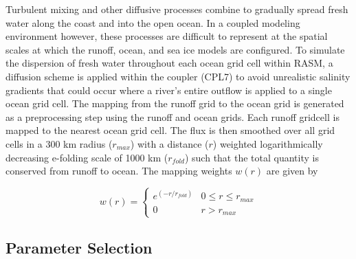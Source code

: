 \documentclass[jgrga, draft]{agutex}
\begin{document}
\begin{article}
\begin{itemize}[leftmargin=+.5in]
\begin{itemize}[leftmargin=+.5in]
Turbulent mixing and other diffusive processes combine to gradually spread fresh water along the coast and into the open ocean.
In a coupled modeling environment however, these processes are difficult to represent at the spatial scales at which the runoff, ocean, and sea ice models are configured.
To simulate the dispersion of fresh water throughout each ocean grid cell within RASM, a diffusion scheme is applied within the coupler (CPL7) to avoid unrealistic salinity gradients that could occur where a river's entire outflow is applied to a single ocean grid cell.
The mapping from the runoff grid to the ocean grid is generated as a preprocessing step using the runoff and ocean grids.
Each runoff gridcell is mapped to the nearest ocean grid cell.
The flux is then smoothed over all grid cells in a 300 km radius ($r_{max}$) with a distance ($r$) weighted logarithmically decreasing e-folding scale of 1000 km ($r_{fold}$) such that the total quantity is conserved from runoff to ocean.
The mapping weights $w(r)$ are given by

\begin{equation}
  \label{eq:diffusion}
  w(r)=
     \begin{cases}
        e^{(-r/r_{fold})} & 0\leq r\leq r_{max} \\
        0 & r > r_{max}
     \end{cases}
\end{equation}

\subsection{Parameter Selection}
\label{sec:parameters}


\end{itemize}
\end{itemize}
\end{article}
\end{document}
